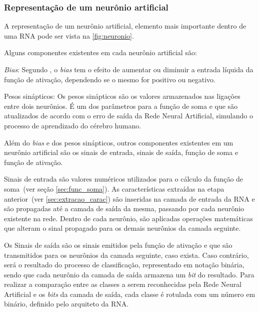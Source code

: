 \documentclass[12pt,oneside,a4paper,chapter=TITLE,section=TITLE,sumario
		=tradicional]{abntex2}
\begin{document}
		\subsubsection{Representação de um neurônio artificial}
		
		A representação de um neurônio artificial, elemento mais importante dentro de uma RNA pode ser vista na \autoref{fig:neuronio}.
		
		\begin{figure}[H]
		\end{figure}
		
		Alguns componentes existentes em cada neurônio artificial são:
		
		\begin{lista}
			\item \textit{Bias}: Segundo , o \textit{bias} tem o efeito de aumentar ou diminuir a entrada líquida da função de ativação, dependendo se o mesmo for positivo ou negativo.
			
			\item Pesos sinápticos: Os pesos sinápticos são os valores armazenados nas ligações entre dois neurônios. É um dos parâmetros para a função de soma e que são atualizados de acordo com o erro de saída da Rede Neural Artificial, simulando o processo de aprendizado do cérebro humano.
		\end{lista}
		
		Além do \textit{bias} e dos pesos sinápticos, outros componentes existentes em um neurônio artificial são os sinais de entrada, sinais de saída, função de soma e função de ativação.
		
		
		Sinais de entrada são valores numéricos utilizados para o cálculo da função de soma~(ver seção \ref{sec:func_soma}). As características extraídas na etapa anterior~(ver \autoref{sec:extracao_carac}) são inseridas na camada de entrada da RNA e são propagadas até a camada de saída da mesma, passando por cada neurônio existente na rede. Dentro de cada neurônio, são aplicadas operações matemáticas que alteram o sinal propagado para os demais neurônios da camada seguinte. 
		
		
		Os Sinais de saída são os sinais emitidos pela função de ativação e que são transmitidos para os neurônios da camada seguinte, caso exista. Caso contrário, será o resultado do processo de classificação, representado em notação binária, sendo que cada neurônio da camada de saída armazena um \textit{bit} do resultado. Para realizar a comparação entre as classes a serem reconhecidas pela Rede Neural Artificial e os \textit{bits} da camada de saída, cada classe é rotulada com um número em binário, definido pelo arquiteto da RNA.
		
\end{document}

